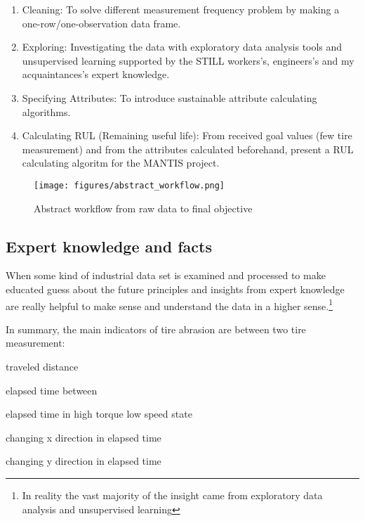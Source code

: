 \begin{enumerate}
	\item {Cleaning:} To solve different measurement frequency problem by making a one-row/one-observation data frame.
	\item {Exploring:} Investigating the data with exploratory data analysis tools and unsupervised learning supported by the STILL workers's, engineers's and my acquaintances's expert knowledge.
 	\item {Specifying Attributes:} To introduce sustainable attribute calculating algorithms.
 	\item {Calculating RUL (Remaining useful life):} From received goal values (few tire measurement) and from the attributes calculated beforehand, present a RUL calculating algoritm for the MANTIS project.
\end{enumerate}

\begin{figure}[!ht]
\centering
\texttt{[image: figures/abstract\_workflow.png]}
\caption{Abstract workflow from raw data to final objective} 
\end{figure}

\subsection{Expert knowledge and facts}
\noindent
When some kind of industrial data set is examined and processed to make educated guess about the future principles and insights from expert knowledge are really helpful to make sense and understand the data in a higher sense.\footnote{In reality the vast majority of the insight came from exploratory data analysis and unsupervised learning}

\noindent
In summary, the main indicators of tire abrasion are between two tire measurement:
\begin{itemise}
	\item{traveled distance } 
	\item{elapsed time between}
	\item{elapsed time in high torque low speed state}
	\item{changing x direction in elapsed time}
	\item{changing y direction in elapsed time}
\end{itemise}

